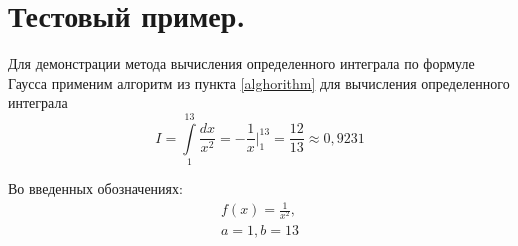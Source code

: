 \documentclass[a4paper, 12pt]{article}
\begin{document}
	\section{Тестовый пример.}
	
	Для демонстрации метода вычисления определенного интеграла по формуле Гаусса применим алгоритм из пункта \ref{alghorithm} для вычисления определенного интеграла
	\begin{equation}
		I=\int\limits_1^{13}\frac{dx}{x^2}=-\frac{1}{x}\bigg|_1^{13}=\frac{12}{13}\approx0,9231
	\end{equation}

	Во введенных обозначениях:
	\begin{equation*}
		\begin{gathered}
		f(x)=\frac{1}{x^2},\\
		a=1, b=13
		\end{gathered}
	\end{equation*}
	
\end{document}
